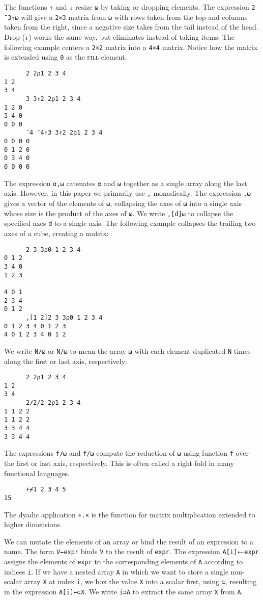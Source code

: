 \documentclass[10pt,twocolumn,english,format=sigplan,screen,balance]{acmart}
\newcommand{\noun}[1]{\textsc{#1}}
\begin{document}
The functions \texttt{↑} and \texttt{↓} resize \texttt{⍵} by taking
or dropping elements. The expression \texttt{2 ¯3↑⍵} will give a \texttt{2×3}
matrix from \texttt{⍵} with rows taken from the top and columns taken
from the right, since a negative size takes from the tail instead
of the head. Drop (\texttt{↓}) works the same way, but eliminates
instead of taking items. The following example centers a \texttt{2×2}
matrix into a \texttt{4×4} matrix. Notice how the matrix is extended
using \texttt{0} as the \noun{fill} element.
\begin{verbatim}
      2 2⍴1 2 3 4
1 2
3 4
      3 3↑2 2⍴1 2 3 4
1 2 0
3 4 0
0 0 0
      ¯4 ¯4↑3 3↑2 2⍴1 2 3 4
0 0 0 0
0 1 2 0
0 3 4 0
0 0 0 0
\end{verbatim}
The expression \texttt{⍺,⍵} catenates \texttt{⍺} and \texttt{⍵} together
as a single array along the last axis. However, in this paper we primarily
use \texttt{,} monadically. The expression \texttt{,⍵} gives a vector
of the elements of \texttt{⍵}, collapsing the axes of \texttt{⍵} into
a single axis whose size is the product of the axes of \texttt{⍵}.
We write \texttt{,{[}d{]}⍵} to collapse the specified axes \texttt{d}
to a single axis. The following example collapses the trailing two
axes of a cube, creating a matrix:
\begin{verbatim}
      2 3 3⍴0 1 2 3 4
0 1 2
3 4 0
1 2 3
     
4 0 1
2 3 4
0 1 2
      ,[1 2]2 3 3⍴0 1 2 3 4
0 1 2 3 4 0 1 2 3
4 0 1 2 3 4 0 1 2
\end{verbatim}
We write \texttt{N⌿⍵} or \texttt{N/⍵} to mean the array \texttt{⍵}
with each element duplicated \texttt{N} times along the first or last
axis, respectively:
\begin{verbatim}
      2 2⍴1 2 3 4
1 2
3 4
      2⌿2/2 2⍴1 2 3 4
1 1 2 2
1 1 2 2
3 3 4 4
3 3 4 4
\end{verbatim}
The expressions \texttt{f⌿⍵} and \texttt{f/⍵} compute the reduction
of \texttt{⍵} using function \texttt{f} over the first or last axis,
respectively. This is often called a right fold in many functional
languages.
\begin{verbatim}
      +⌿1 2 3 4 5
15
\end{verbatim}
The dyadic application \texttt{+.×} is the function for matrix multiplication
extended to higher dimensions. 

We can mutate the elements of an array or bind the result of an expression
to a name. The form \texttt{V←expr} binds \texttt{V} to the result
of \texttt{expr}. The expression \texttt{A{[}i{]}}←\texttt{expr} assigns
the elements of \texttt{expr} to the corresponding elements of \texttt{A}
according to indices \texttt{i}. If we have a nested array \texttt{A}
in which we want to store a single non-scalar array \texttt{X} at
index \texttt{i}, we box the value \texttt{X} into a scalar first,
using \texttt{⊂}, resulting in the expression \texttt{A{[}i{]}←⊂X}.
We write \texttt{i⊃A} to extract the same array \texttt{X} from \texttt{A}.
\end{document}
